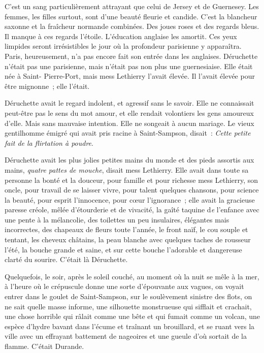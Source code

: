 \documentclass[french,twoside]{book} %
\begin{document}
C’est un sang particulièrement attrayant que celui de Jersey et de Guernesey. Les femmes, les filles surtout, sont d’une beauté fleurie et candide. C’est la blancheur saxonne et la fraîcheur normande combinées. Des joues roses et des regards bleus. Il manque à ces regards l’étoile. L’éducation anglaise les amortit. Ces yeux limpides seront irrésistibles le jour où la profondeur parisienne y apparaîtra. Paris, heureusement, n’a pas encore fait son entrée dans les anglaises. Déruchette n’était pas une parisienne, mais n’était pas non plus une guernesiaise. Elle était née à Saint- Pierre-Port, mais mess Lethierry l’avait élevée. Il l’avait élevée pour être mignonne ; elle l’était.\par
Déruchette avait le regard indolent, et agressif sans le savoir. Elle ne connaissait peut-être pas le sens du mot amour, et elle rendait volontiers les gens amoureux d’elle. Mais sans mauvaise intention. Elle ne songeait à aucun mariage. Le vieux gentilhomme émigré qui avait pris racine à Saint-Sampson, disait : \emph{Cette petite fait de la flirtation à poudre}.\par
Déruchette avait les plus jolies petites mains du monde et des pieds assortis aux mains, \emph{quatre pattes de mouche}, disait mess Lethierry. Elle avait dans toute sa personne la bonté et la douceur, pour famille et pour richesse mess Lethierry, son oncle, pour travail de se laisser vivre, pour talent quelques chansons, pour science la beauté, pour esprit l’innocence, pour cœur l’ignorance ; elle avait la gracieuse paresse créole, mêlée d’étourderie et de vivacité, la gaîté taquine d\emph{e }l’enfance avec une pente à la mélancolie, des toilettes un peu insulaires, élégantes mais incorrectes, des chapeaux de fleurs toute l’année, le front naïf, le cou souple et tentant, les cheveux châtains, la peau blanche avec quelques taches de rousseur l’été, la bouche grande et saine, et sur cette bouche l’adorable et dangereuse clarté du sourire. C’était là Déruchette.\par
Quelquefois, le soir, après le soleil couché, au moment où la nuit se mêle à la mer, à l’heure où le crépuscule donne une sorte d’épouvante aux vagues, on voyait entrer dans le goulet de Saint-Sampson, sur  le soulèvement sinistre des flots, on ne sait quelle masse informe, une silhouette monstrueuse qui sifflait et crachait, une chose horrible qui râlait comme une bête et qui fumait comme un volcan, une espèce d’hydre bavant dans l’écume et traînant un brouillard, et se ruant vers la ville avec un effrayant battement de nageoires et une gueule d’où sortait de la flamme. C’était Durande.
\end{document}
